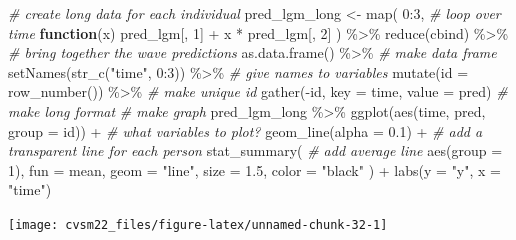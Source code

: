 \documentclass[
  11pt,
]{krantz}
\makeatletter
\newenvironment{Shaded}{\begin{snugshade}}{\end{snugshade}}
\newcommand{\AttributeTok}[1]{\textcolor[rgb]{0.61,0.61,0.61}{#1}}
\newcommand{\CommentTok}[1]{\textcolor[rgb]{0.37,0.37,0.37}{\textit{#1}}}
\newcommand{\ControlFlowTok}[1]{\textcolor[rgb]{0.27,0.27,0.27}{\textbf{#1}}}
\newcommand{\DecValTok}[1]{\textcolor[rgb]{0.06,0.06,0.06}{#1}}
\newcommand{\FloatTok}[1]{\textcolor[rgb]{0.06,0.06,0.06}{#1}}
\newcommand{\FunctionTok}[1]{\textcolor[rgb]{0,0,0}{#1}}
\newcommand{\NormalTok}[1]{#1}
\newcommand{\OtherTok}[1]{\textcolor[rgb]{0.37,0.37,0.37}{#1}}
\newcommand{\SpecialCharTok}[1]{\textcolor[rgb]{0,0,0}{#1}}
\newcommand{\StringTok}[1]{\textcolor[rgb]{0.5,0.5,0.5}{#1}}
\newenvironment{kframe}{%
\medskip{}
\setlength{\fboxsep}{.8em}
 \def\at@end@of@kframe{}%
 \ifinner\ifhmode%
  \def\at@end@of@kframe{\end{minipage}}%
  \begin{minipage}{\columnwidth}%
 \fi\fi%
 \def\FrameCommand##1{\hskip\@totalleftmargin \hskip-\fboxsep
 \colorbox{shadecolor}{##1}\hskip-\fboxsep
     \hskip-\linewidth \hskip-\@totalleftmargin \hskip\columnwidth}%
 \MakeFramed {\advance\hsize-\width
   \@totalleftmargin\z@ \linewidth\hsize
   \@setminipage}}%
 {\par\unskip\endMakeFramed%
 \at@end@of@kframe}
\renewenvironment{Shaded}{\begin{kframe}}{\end{kframe}}
\theoremstyle{definition}
\theoremstyle{definition}
\theoremstyle{definition}
\theoremstyle{definition}
\theoremstyle{remark}
\makeatother
\begin{document}
\begin{Shaded}
\begin{Highlighting}[]
\CommentTok{\# create long data for each individual}
\NormalTok{pred\_lgm\_long }\OtherTok{\textless{}{-}} \FunctionTok{map}\NormalTok{(}
  \DecValTok{0}\SpecialCharTok{:}\DecValTok{3}\NormalTok{, }\CommentTok{\# loop over time}
  \ControlFlowTok{function}\NormalTok{(x) pred\_lgm[, }\DecValTok{1}\NormalTok{] }\SpecialCharTok{+}\NormalTok{ x }\SpecialCharTok{*}\NormalTok{ pred\_lgm[, }\DecValTok{2}\NormalTok{]}
\NormalTok{) }\SpecialCharTok{\%\textgreater{}\%}
  \FunctionTok{reduce}\NormalTok{(cbind) }\SpecialCharTok{\%\textgreater{}\%} \CommentTok{\# bring together the wave predictions}
  \FunctionTok{as.data.frame}\NormalTok{() }\SpecialCharTok{\%\textgreater{}\%} \CommentTok{\# make data frame}
  \FunctionTok{setNames}\NormalTok{(}\FunctionTok{str\_c}\NormalTok{(}\StringTok{"time"}\NormalTok{, }\DecValTok{0}\SpecialCharTok{:}\DecValTok{3}\NormalTok{)) }\SpecialCharTok{\%\textgreater{}\%} \CommentTok{\# give names to variables}
  \FunctionTok{mutate}\NormalTok{(}\AttributeTok{id =} \FunctionTok{row\_number}\NormalTok{()) }\SpecialCharTok{\%\textgreater{}\%} \CommentTok{\# make unique id}
  \FunctionTok{gather}\NormalTok{(}\SpecialCharTok{{-}}\NormalTok{id, }\AttributeTok{key =}\NormalTok{ time, }\AttributeTok{value =}\NormalTok{ pred) }\CommentTok{\# make long format}
\CommentTok{\# make graph}
\NormalTok{pred\_lgm\_long }\SpecialCharTok{\%\textgreater{}\%}
  \FunctionTok{ggplot}\NormalTok{(}\FunctionTok{aes}\NormalTok{(time, pred, }\AttributeTok{group =}\NormalTok{ id)) }\SpecialCharTok{+} \CommentTok{\# what variables to plot?}
  \FunctionTok{geom\_line}\NormalTok{(}\AttributeTok{alpha =} \FloatTok{0.1}\NormalTok{) }\SpecialCharTok{+} \CommentTok{\# add a transparent line for each person}
  \FunctionTok{stat\_summary}\NormalTok{( }\CommentTok{\# add average line}
    \FunctionTok{aes}\NormalTok{(}\AttributeTok{group =} \DecValTok{1}\NormalTok{),}
    \AttributeTok{fun =}\NormalTok{ mean,}
    \AttributeTok{geom =} \StringTok{"line"}\NormalTok{,}
    \AttributeTok{size =} \FloatTok{1.5}\NormalTok{,}
    \AttributeTok{color =} \StringTok{"black"}
\NormalTok{  ) }\SpecialCharTok{+}
  \FunctionTok{labs}\NormalTok{(}\AttributeTok{y =} \StringTok{"y"}\NormalTok{, }\AttributeTok{x =} \StringTok{"time"}\NormalTok{)}
\end{Highlighting}
\end{Shaded}

\begin{center}\texttt{[image: cvsm22\_files/figure-latex/unnamed-chunk-32-1]} \end{center}
\end{document}

